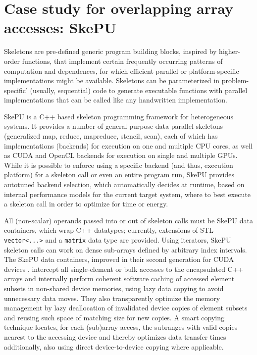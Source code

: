 \section{Case study for overlapping array accesses: SkePU}

Skeletons are pre-defined generic program building blocks,
inspired by higher-order functions,
that implement certain frequently occurring patterns of
computation and dependences, for which efficient parallel
or platform-specific implementations might be available.
Skeletons can be parameterized in problem-specific'
(usually, sequential) code to generate executable functions
with parallel implementations that can be called like
any handwritten implementation.

SkePU \cite{Enmyren10,Ernstsson18} 
is a C++ based skeleton programming framework for heterogeneous systems.
It provides a number of general-purpose data-parallel skeletons
(generalized map, reduce, mapreduce, stencil, scan), each of
which has implementations (backends) for execution on one and multiple CPU cores, as
well as CUDA and OpenCL backends for execution on single and multiple GPUs.
While it is possible to enforce using a specific backend (and thus,
execution platform) for a skeleton call or even an entire program
run, SkePU provides autotuned backend selection, which automatically 
decides at runtime,
based on internal performance models for the current target system, 
where to best execute a 
skeleton call in order to optimize for time or energy. 

All (non-scalar) operands passed into or out of skeleton calls must be
SkePU data containers, which wrap C++ datatypes;
currently, extensions of STL \texttt{vector<...>}
and a \texttt{matrix} data type are provided.
Using iterators, SkePU skeleton calls can work on dense sub-arrays
defined by arbitrary index intervals.
The SkePU data containers, improved in their second generation for
CUDA devices \cite{Dastgeer-IJPP15}, intercept all single-element
or bulk accesses to the encapsulated C++ arrays and
internally perform coherent software caching of
accessed element subsets in non-shared device memories, 
using lazy data copying to avoid unnecessary data moves.
They also transparently optimize the memory management
by lazy deallocation of invalidated device copies of element
subsets and reusing such space of matching size for new copies.
A smart copying technique locates, for each (sub)array access, the 
subranges with valid copies nearest to the accessing device
and thereby optimizes data transfer times additionally,
also using direct device-to-device copying where applicable.



